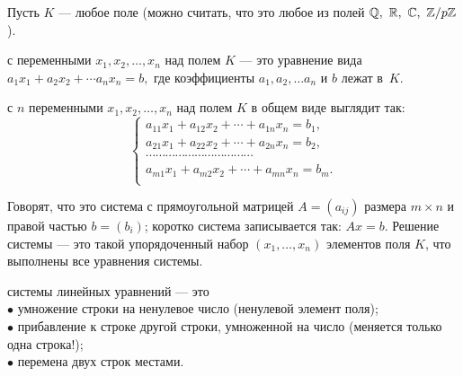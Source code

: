 \documentclass[a4paper,12pt]{article}
\begin{document}
	
Пусть $K$ --- любое поле (можно считать, что это любое из полей $\mathbb{Q},\ \mathbb{R},\ \mathbb{C},\ \mathbb{Z}/p\mathbb{Z}$).


 с переменными $x_1, x_2, \ldots, x_n$ над полем $K$ --- это уравнение вида
$a_1x_1 + a_2x_2 + \cdots a_nx_n = b,$ где  коэффициенты $a_1, a_2,\ldots a_n$ и  $b$ лежат в~$K$.


 с $n$ переменными $x_1, x_2, \ldots, x_n$ над полем $K$ в общем виде выглядит так:
\vspace*{-3mm}
	$$
	\begin{cases}
		a_{11}x_1 + a_{12}x_2 + \cdots + a_{1n}x_n = b_1,\\
		a_{21}x_1 + a_{22}x_2 + \cdots + a_{2n}x_n = b_2,\\
		\cdots \cdots \cdots \cdots 		\cdots \cdots \cdots \cdots \cdots \cdots \cdots \\
		a_{m1}x_1 + a_{m2}x_2 + \cdots + a_{mn}x_n = b_m.\\
	\end{cases}
	$$

\vspace*{2mm}
Говорят, что это система с прямоугольной матрицей $A = (a_{ij})$ размера $m \times n$ и правой частью $b = (b_i)$; коротко
система записывается так: $Ax = b$. %
Решение системы --- это такой упорядоченный набор $(x_1,\ldots,x_n)$ элементов поля $K$, что выполнены все уравнения системы.



	 системы линейных уравнений --- это \\
$\bullet$ умножение строки на ненулевое число (ненулевой элемент поля);\\
$\bullet$ прибавление к строке другой строки, умноженной на число (меняется только одна строка!);\\
$\bullet$ перемена двух строк местами.
\end{document}

